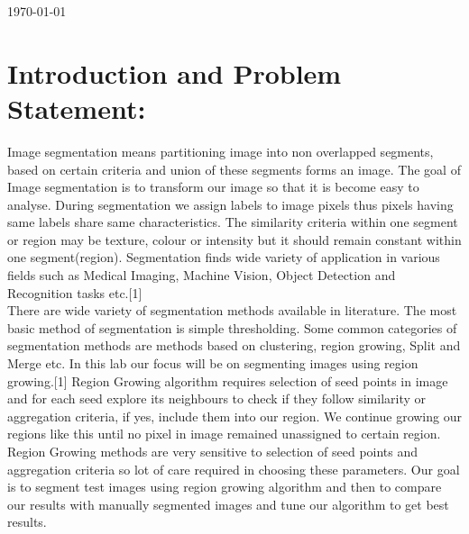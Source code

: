 \documentclass{article}
\begin{document}
\begin{titlepage}

{\large \today}\\[3cm] %


 

\vfill %
\end{titlepage}

\section{Introduction and Problem Statement:}
Image segmentation means partitioning image into non overlapped segments, based on certain criteria and union of these segments forms an image. The goal of Image segmentation is to transform our image so that it is become easy to analyse. During segmentation we assign labels to image pixels thus pixels having same labels share same characteristics. The similarity criteria within one segment or region may be texture, colour  or intensity but it should remain constant within one segment(region). Segmentation finds wide variety of application in various fields such as Medical Imaging, Machine Vision, Object Detection and Recognition tasks etc.[1] \\
There are wide variety of segmentation methods available in literature. The most basic method of segmentation is simple thresholding. Some common categories of segmentation methods are methods based on clustering, region growing, Split and Merge etc. In this lab our focus will be on segmenting images using region growing.[1] Region Growing algorithm requires selection of seed points in image and for each seed explore its neighbours to check if they follow similarity or aggregation criteria, if yes, include them into our region. We continue growing our regions like this until no pixel in image remained unassigned to certain region. Region Growing methods are very sensitive to selection of seed points and aggregation criteria so lot of care required in choosing these parameters. Our goal is to segment test images using region growing algorithm and then to compare our results with manually segmented images and tune our algorithm to get best results.
\end{document}
